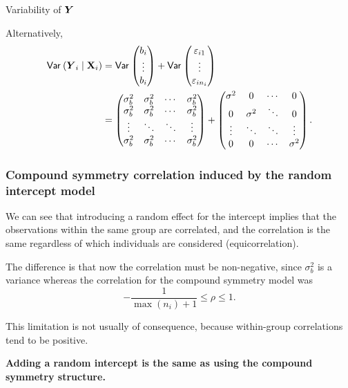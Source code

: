 \documentclass{beamer}
\begin{document}
\begin{frame}{Variability of $\boldsymbol {Y}$}


Alternatively,
\begin{align*}
   {\mathsf{Var}_{}}\left(\boldsymbol {Y}_i \mid \mathbf{X}_i\right) &= {\mathsf{Var}_{}}\left(
   \begin{matrix} b_i \\ \vdots \\ b_i 
   \end{matrix}
   \right) + {\mathsf{Var}_{}}\left(\begin{matrix}\varepsilon_{i1} \\ \vdots \\ \varepsilon_{in_i}\end{matrix}\right) \\&= 
   \begin{pmatrix}
 \sigma^2_b &  \sigma^2_b & \cdots & \sigma^2_b \\
  \sigma^2_b &  \sigma^2_b & \cdots & \sigma^2_b \\
 \vdots & \ddots & \ddots & \vdots \\
 \sigma^2_b &  \sigma^2_b & \cdots & \sigma^2_b   
 \end{pmatrix} + \begin{pmatrix}
 \sigma^2 & 0 & \cdots &0\\
 0 & \sigma^2 & \ddots &0\\
 \vdots &\ddots & \ddots & \vdots\\
 0 & 0 & \cdots & \sigma^2
 \end{pmatrix}.
\end{align*}

\end{frame}


\begin{frame}[fragile]
\frametitle{Compound symmetry correlation induced by the random intercept model}
\bi
\item We can see that introducing a random effect for the intercept implies that the observations within the same group are correlated, and the correlation is the same regardless of which individuals are considered (equicorrelation).
\item The difference is that now the correlation must be non-negative, since $\sigma^2_b$ is a variance whereas the correlation for the compound symmetry model was \[-\frac{1}{\max(n_i)+1} \leq \rho \leq 1.\]
\item This limitation is not usually of consequence, because within-group correlations tend to be positive.
\item \textbf{Adding a random intercept is the same as using the compound symmetry structure.}

\ei
\end{frame}
\end{document}

